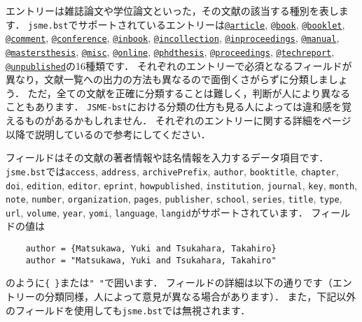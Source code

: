 \documentclass[a4paper,fleqn,uplatex,dvipdfmx]{jsarticle}
\newcommand{\jsmefile}{\texttt{jsme.bst}}
\newcommand{\JSMErepos}{\texttt{JSME-bst}}
\begin{document}
エントリーは雑誌論文や学位論文といった，その文献の該当する種別を表します．
\jsmefile でサポートされているエントリーは\hyperref[ssec:article]{\texttt{@article}}, \hyperref[ssec:book]{\texttt{@book}}, \hyperref[ssec:booklet]{\texttt{@booklet}}, \hyperref[ssec:comment]{\texttt{@comment}}, \hyperref[ssec:conference]{\texttt{@conference}}, \hyperref[ssec:inbook]{\texttt{@inbook}}, \hyperref[ssec:incollection]{\texttt{@incollection}}, \hyperref[ssec:inproceedings]{\texttt{@inproceedings}}, \hyperref[ssec:manual]{\texttt{@manual}}, \hyperref[ssec:mastersthesis]{\texttt{@mastersthesis}}, \hyperref[ssec:misc]{\texttt{@misc}}, \hyperref[ssec:online]{\texttt{@online}}, \hyperref[ssec:phdthesis]{\texttt{@phdthesis}}, \hyperref[ssec:proceedings]{\texttt{@proceedings}}, \hyperref[ssec:techreport]{\texttt{@techreport}}, \hyperref[ssec:unpublished]{\texttt{@unpublished}}の16種類です．
それぞれのエントリーで必須となるフィールドが異なり，文献一覧への出力の方法も異なるので面倒くさがらずに分類しましょう．
ただ，全ての文献を正確に分類することは難しく，判断が人により異なることもあります．
\JSMErepos における分類の仕方も見る人によっては違和感を覚えるものがあるかもしれません．
それぞれのエントリーに関する詳細を\pageref{ssec:article}ページ以降で説明しているので参考にしてください．

フィールドはその文献の著者情報や誌名情報を入力するデータ項目です．
\jsmefile では\verb|access|, \verb|address|, \verb|archivePrefix|, \verb|author|, \verb|booktitle|, \verb|chapter|, \verb|doi|, \verb|edition|, \verb|editor|, \verb|eprint|, \verb|howpublished|, \verb|institution|, \verb|journal|, \verb|key|, \verb|month|, \verb|note|, \verb|number|, \verb|organization|, \verb|pages|, \verb|publisher|, \verb|school|, \verb|series|, \verb|title|, \verb|type|, \verb|url|, \verb|volume|, \verb|year|, \verb|yomi|, \verb|language|, \verb|langid|がサポートされています．
フィールドの値は
\begin{verbatim}
    author = {Matsukawa, Yuki and Tsukahara, Takahiro}
    author = "Matsukawa, Yuki and Tsukahara, Takahiro"
\end{verbatim}
のように\verb|{ }|または\verb|" "|で囲います．
フィールドの詳細は以下の通りです（エントリーの分類同様，人によって意見が異なる場合があります）．
また，下記以外のフィールドを使用しても\jsmefile では無視されます．
\end{document}
